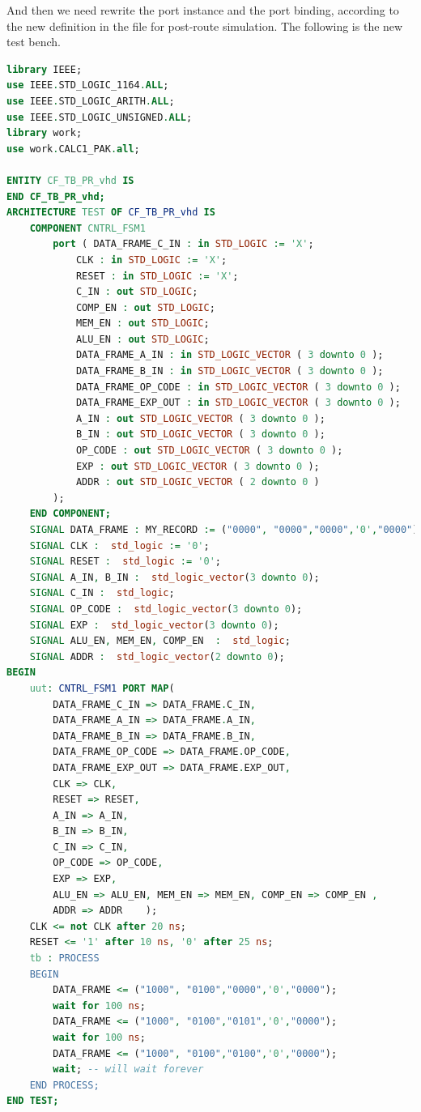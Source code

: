 \documentclass{article}
\begin{document}
    And then we need rewrite the port instance and the port binding, according to the new definition in the file for
    post-route simulation. The following is the new test bench.
    
    \begin{lstlisting}[language=VHDL,caption=Test Bench for Post-route Simulation]
library IEEE;
use IEEE.STD_LOGIC_1164.ALL;
use IEEE.STD_LOGIC_ARITH.ALL;
use IEEE.STD_LOGIC_UNSIGNED.ALL;
library work;
use work.CALC1_PAK.all;

ENTITY CF_TB_PR_vhd IS
END CF_TB_PR_vhd;
ARCHITECTURE TEST OF CF_TB_PR_vhd IS 
    COMPONENT CNTRL_FSM1
        port ( DATA_FRAME_C_IN : in STD_LOGIC := 'X'; 
            CLK : in STD_LOGIC := 'X';
            RESET : in STD_LOGIC := 'X'; 
            C_IN : out STD_LOGIC; 
            COMP_EN : out STD_LOGIC;
            MEM_EN : out STD_LOGIC; 
            ALU_EN : out STD_LOGIC; 
            DATA_FRAME_A_IN : in STD_LOGIC_VECTOR ( 3 downto 0 ); 
            DATA_FRAME_B_IN : in STD_LOGIC_VECTOR ( 3 downto 0 ); 
            DATA_FRAME_OP_CODE : in STD_LOGIC_VECTOR ( 3 downto 0 ); 
            DATA_FRAME_EXP_OUT : in STD_LOGIC_VECTOR ( 3 downto 0 ); 
            A_IN : out STD_LOGIC_VECTOR ( 3 downto 0 ); 
            B_IN : out STD_LOGIC_VECTOR ( 3 downto 0 ); 
            OP_CODE : out STD_LOGIC_VECTOR ( 3 downto 0 ); 
            EXP : out STD_LOGIC_VECTOR ( 3 downto 0 ); 
            ADDR : out STD_LOGIC_VECTOR ( 2 downto 0 ) 
        );
    END COMPONENT;
    SIGNAL DATA_FRAME : MY_RECORD := ("0000", "0000","0000",'0',"0000");
    SIGNAL CLK :  std_logic := '0';
    SIGNAL RESET :  std_logic := '0';
    SIGNAL A_IN, B_IN :  std_logic_vector(3 downto 0);	 
    SIGNAL C_IN :  std_logic;
    SIGNAL OP_CODE :  std_logic_vector(3 downto 0);
    SIGNAL EXP :  std_logic_vector(3 downto 0);
    SIGNAL ALU_EN, MEM_EN, COMP_EN  :  std_logic;
    SIGNAL ADDR :  std_logic_vector(2 downto 0);
BEGIN 
    uut: CNTRL_FSM1 PORT MAP(
        DATA_FRAME_C_IN => DATA_FRAME.C_IN,
        DATA_FRAME_A_IN => DATA_FRAME.A_IN,
        DATA_FRAME_B_IN => DATA_FRAME.B_IN,
        DATA_FRAME_OP_CODE => DATA_FRAME.OP_CODE,
        DATA_FRAME_EXP_OUT => DATA_FRAME.EXP_OUT,
        CLK => CLK,
        RESET => RESET,
        A_IN => A_IN,
        B_IN => B_IN,
        C_IN => C_IN,
        OP_CODE => OP_CODE,
        EXP => EXP,
        ALU_EN => ALU_EN, MEM_EN => MEM_EN, COMP_EN => COMP_EN ,
        ADDR => ADDR	);    
    CLK <= not CLK after 20 ns;
    RESET <= '1' after 10 ns, '0' after 25 ns;    
    tb : PROCESS
    BEGIN
        DATA_FRAME <= ("1000", "0100","0000",'0',"0000");		 
        wait for 100 ns;
        DATA_FRAME <= ("1000", "0100","0101",'0',"0000");		 
        wait for 100 ns;
        DATA_FRAME <= ("1000", "0100","0100",'0',"0000");
        wait; -- will wait forever
    END PROCESS;
END TEST;
    \end{lstlisting}    
    
\end{document}
